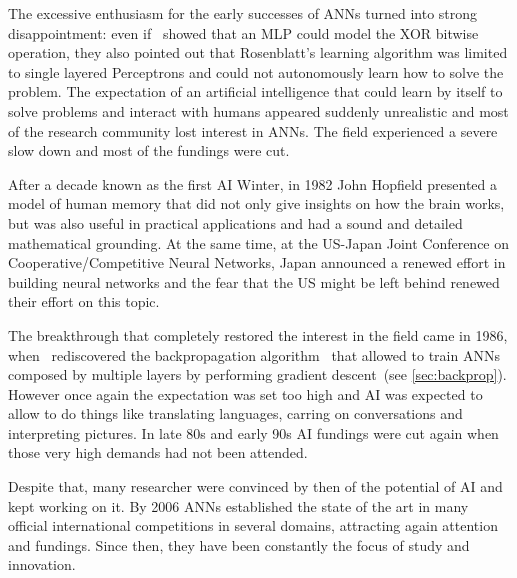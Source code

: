 The excessive enthusiasm for the early successes of ANNs turned into strong
disappointment: even if~\cite{Minsky69} showed that an MLP could model the XOR
bitwise operation, they also pointed out that Rosenblatt's learning algorithm
was limited to single layered Perceptrons and could not autonomously learn how
to solve the problem. The expectation of an artificial intelligence that could
learn by itself to solve problems and interact with humans appeared suddenly
unrealistic and most of the research community lost interest in ANNs. The field
experienced a severe slow down and most of the fundings were cut.

After a decade known as the first AI Winter, in 1982 John Hopfield presented a
model of human memory that did not only give insights on how the brain works,
but was also useful in practical applications and had a sound and detailed
mathematical grounding. At the same time, at the US-Japan Joint Conference on
Cooperative/Competitive Neural Networks, Japan announced a renewed effort in
building neural networks and the fear that the US might be left behind renewed
their effort on this topic.

The breakthrough that completely restored the interest in the field came in
1986, when~\cite{Rumelhart86b} rediscovered the backpropagation
algorithm~\citep{Linnainmaa70,Werbos74} that allowed to train ANNs composed by
multiple layers by performing gradient descent~(see \autoref{sec:backprop}).
However once again the expectation was set too high and AI was expected to
allow to do things like translating languages, carring on conversations and
interpreting pictures. In late 80s and early 90s AI fundings were cut again
when those very high demands had not been attended.

Despite that, many researcher were convinced by then of the potential of AI
and kept working on it. By 2006 ANNs established the state of the art in many
official international competitions in several domains, attracting again
attention and fundings. Since then, they have been constantly the focus of
study and innovation.

